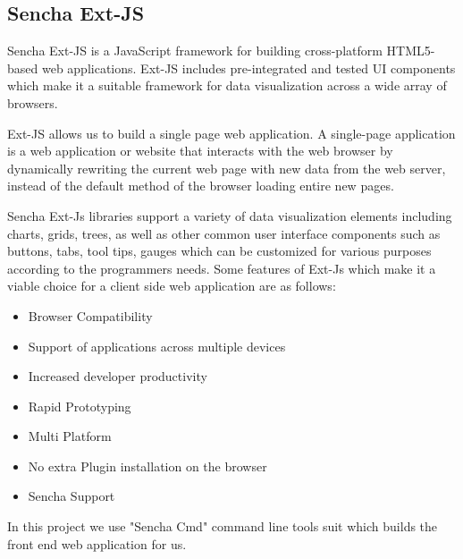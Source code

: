 

\subsection{Sencha Ext-JS}
\label{sec:ext_js}
Sencha Ext-JS is a JavaScript framework for building  cross-platform HTML5-based web applications. Ext-JS includes pre-integrated and tested UI components which make it a suitable framework for data visualization across a wide array of browsers.

Ext-JS allows us to build a single page web application. 
A single-page application is a web application or website that interacts with the web browser by dynamically rewriting the current web page with new data from the web server, instead of the default method of the browser loading entire new pages. 

Sencha Ext-Js libraries support a variety of data visualization elements including charts, grids, trees, as well as other common user interface components such as buttons, tabs, tool tips, gauges which can be customized for various purposes according to the programmers needs. 
Some features of Ext-Js which make it a viable choice for a client side web application are as follows:
\begin{itemize}
  \item Browser Compatibility
  \item Support of applications across multiple devices
  \item Increased developer productivity
  \item Rapid Prototyping
  \item Multi Platform 
  \item No extra Plugin installation on the browser
  \item Sencha Support  
\end{itemize}

In this project we use "Sencha Cmd" command line tools suit which builds the front end web application for us.


 


